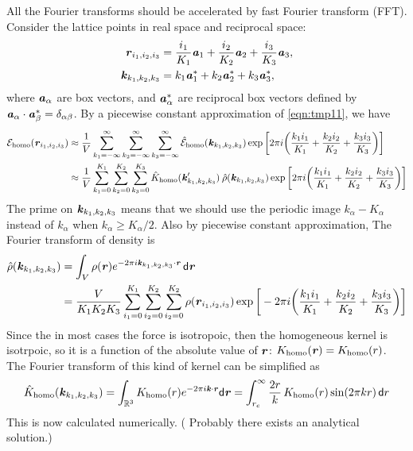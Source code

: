 \documentclass[aps,pre,preprint,unsortedaddress]{revtex4}
\newcommand{\recheck}[1]{{\color{red} #1}}
\renewcommand{\v}[1]{\textbf{\textit{#1}}}
\renewcommand{\d}[1]{\textsf{#1}}
\begin{document}
All the Fourier transforms should be accelerated by fast Fourier
transform (FFT). Consider the lattice points in real space and
reciprocal space:
\begin{align}
  \v r_{i_1, i_2, i_3} & =
  \frac{i_1}{K_1}\v a_1 + 
  \frac{i_2}{K_2}\v a_2 + 
  \frac{i_3}{K_3}\v a_3, \\
  \v k_{k_1, k_2, k_3} & =
  k_1\v a_1^\ast +
  k_2\v a_2^\ast +
  k_3\v a_3^\ast,
\end{align}
where $\v a_\alpha$ are box vectors, and $\v a_\alpha^\ast$ are
reciprocal box vectors defined by $\v a_\alpha\cdot\v a_\beta^\ast =
\delta_{\alpha\beta}$. By a piecewise constant approximation of
\eqref{eqn:tmp11}, we have
\begin{align}\nonumber
  \mathcal E_{\textrm{homo}}(\v r_{i_1,i_2,i_3})
  & \approx
  \frac1V\sum_{k_1=-\infty}^\infty\sum_{k_2=-\infty}^\infty\sum_{k_3=-\infty}^\infty
  \hat{\mathcal E}_{\textrm{homo}}(\v k_{k_1,k_2,k_3})
  \exp\bigg[
  2\pi i\bigg(
  \frac{k_1i_1}{K_1} + \frac{k_2i_2}{K_2} + \frac{k_3i_3}{K_3}
  \bigg)
  \bigg] \\
  & \approx
  \frac1V\sum_{k_1=0}^{K_1}\sum_{k_2=0}^{K_2}\sum_{k_3=0}^{K_3}
  \hat{K}_{\textrm{homo}}(\v k'_{k_1,k_2,k_3})\:
  \hat{\rho}(\v k_{k_1,k_2,k_3})
  \exp\bigg[
  2\pi i\bigg(
  \frac{k_1i_1}{K_1} + \frac{k_2i_2}{K_2} + \frac{k_3i_3}{K_3}
  \bigg)
  \bigg]   
\end{align}
The prime on $\v k_{k_1,k_2,k_3}$ means that we should use the
periodic image $k_\alpha - K_\alpha$ instead of $k_\alpha$ when $k_\alpha \geq
K_\alpha/2$. Also by piecewise constant approximation, The Fourier
transform of density is 
\begin{align}\nonumber
  \hat\rho(\v k_{k_1,k_2,k_3})
  &=
  \int_V\rho(\v r)e^{-2\pi i\v k_{k_1,k_2,k_3}\cdot\v r}\,\d d\v r \\
  & =
  \frac{V}{K_1K_2K_3}
  \sum_{i_1=0}^{K_1}\sum_{i_2=0}^{K_2}\sum_{i_2=0}^{K_2}
  \rho(\v r_{i_1,i_2,i_3})
  \exp\bigg[
  -2\pi i\bigg(
  \frac{k_1i_1}{K_1} + \frac{k_2i_2}{K_2} + \frac{k_3i_3}{K_3}
  \bigg)
  \bigg]
\end{align}
Since the in most cases the force is isotropoic, then the homogeneous
kernel is isotrpoic, so it is a function of the absolute value of $\v
r$: $K_{\textrm{homo}}(\v r) = K_{\textrm{homo}}(r)$. The Fourier
transform of this kind of kernel can be simplified as
\begin{align}
  \hat{K}_{\textrm{homo}}(\v k_{k_1,k_2,k_3})
  =
  \int_{\mathbb R^3}K_{\textrm{homo}}(r)e^{-2\pi i\v k\cdot\v r}\d d\v r
  =
  \int_{r_c}^\infty \frac{2 r}k\, K_{\textrm{homo}}(r) \sin(2\pi kr)\,\d dr
\end{align}
This is now calculated numerically. (\recheck{Probably there exists an
analytical solution.})
\end{document}
